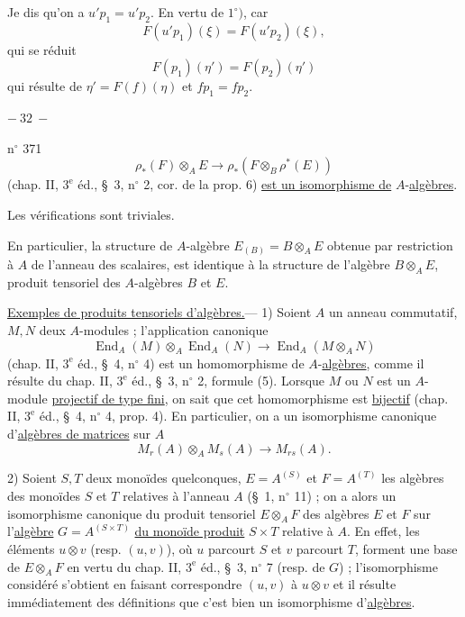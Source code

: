 Je dis qu'on a  $u'p_1=u'p_2$. En vertu de $1^\circ)$, car  
\[
F(u'p_1)(\xi)=F(u'p_2)(\xi),
\]
qui se réduit
\[
F(p_1)(\eta')=F(p_2)(\eta')
\]
qui résulte de $\eta'=F(f)(\eta)$ et $fp_1=fp_2$.
\begin{center}$-\ 32\ -$\end{center}
\hfill n$^\circ$ 371
\[
\rho_*(F)\otimes_A E\longrightarrow\rho_*(F\otimes_B\rho^*(E))
\]
(chap. II, $3^{\mathrm e}$ éd., \S\ 3, n$^\circ$ 2, cor. de la prop. 6) \uline{est un isomorphisme de} $A$-\uline{algèbres}.

Les vérifications sont triviales.

En particulier, la structure de $A$-algèbre  $E_{(B)}=B\otimes_A E$ obtenue par restriction à $A$ de l'anneau des scalaires, est identique à la structure de l'algèbre $B\otimes_A E$, produit tensoriel des $A$-algèbres $B$ et $E$.

\uline{Exemples de produits tensoriels d'algèbres.}--- 1) Soient $A$ un anneau commutatif, $M,N$ deux $A$-modules ; l'application canonique
\[
\operatorname{End}_A(M)\otimes_A\operatorname{End}_A(N)\longrightarrow\operatorname{End}_A(M\otimes_A N)
\]
(chap. II, $3^{\mathrm e}$ éd., \S\ 4, n$^\circ$ 4) est un homomorphisme de $A$-\uline{algèbres}, comme il résulte du chap. II, $3^{\mathrm e}$ éd., \S\ 3, n$^\circ$ 2, formule (5). Lorsque $M$ ou $N$ est un $A$-module \uline{projectif de type fini}, on sait que cet homomorphisme est \uline{bijectif} (chap. II, $3^{\mathrm e}$ éd., \S\ 4, n$^\circ$ 4, prop. 4). En particulier, on a un isomorphisme canonique d'\uline{algèbres de matrices} sur $A$
\[
M_r(A)\otimes_A M_s(A)\longrightarrow M_{rs}(A).
\]

2) Soient $S,T$ deux monoïdes quelconques, $E=A^{(S)}$ et $F=A^{(T)}$ les algèbres des monoïdes $S$ et $T$ relatives à l'anneau $A$ (\S\ 1, n$^\circ$ 11) ; on a alors un isomorphisme canonique du produit tensoriel $E\otimes_A F$ des algèbres $E$ et $F$ sur l'\uline{algèbre} $G=A^{(S\times T)}$ \uline{du monoïde produit} $S\times T$ relative à $A$. En effet, les éléments $u\otimes v$ (resp. $(u,v)$), où $u$ parcourt $S$ et $v$ parcourt $T$, forment une base de $E\otimes_A F$ en vertu du chap. II, $3^{\mathrm e}$ éd., \S\ 3, n$^\circ$ 7 (resp. de $G$) ; l'isomorphisme considéré s'obtient en faisant correspondre $(u,v)$ à $u\otimes v$ et il résulte immédiatement des définitions que c'est bien un isomorphisme d'\uline{algèbres}.

